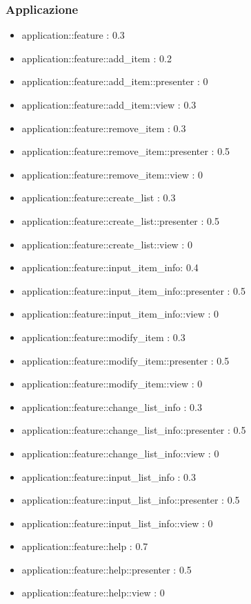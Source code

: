 \subsubsection{Applicazione}

\begin{itemize}

\item application::feature : 0.3
\item application::feature::add\_item : 0.2
\item application::feature::add\_item::presenter : 0
\item application::feature::add\_item::view : 0.3
\item application::feature::remove\_item : 0.3
\item application::feature::remove\_item::presenter : 0.5
\item application::feature::remove\_item::view : 0
\item application::feature::create\_list : 0.3
\item application::feature::create\_list::presenter : 0.5
\item application::feature::create\_list::view : 0
\item application::feature::input\_item\_info: 0.4
\item application::feature::input\_item\_info::presenter : 0.5
\item application::feature::input\_item\_info::view : 0
\item application::feature::modify\_item : 0.3
\item application::feature::modify\_item::presenter : 0.5
\item application::feature::modify\_item::view : 0
\item application::feature::change\_list\_info : 0.3
\item application::feature::change\_list\_info::presenter : 0.5
\item application::feature::change\_list\_info::view : 0
\item application::feature::input\_list\_info : 0.3
\item application::feature::input\_list\_info::presenter : 0.5
\item application::feature::input\_list\_info::view : 0
\item application::feature::help : 0.7
\item application::feature::help::presenter : 0.5
\item application::feature::help::view : 0

\end{itemize}

